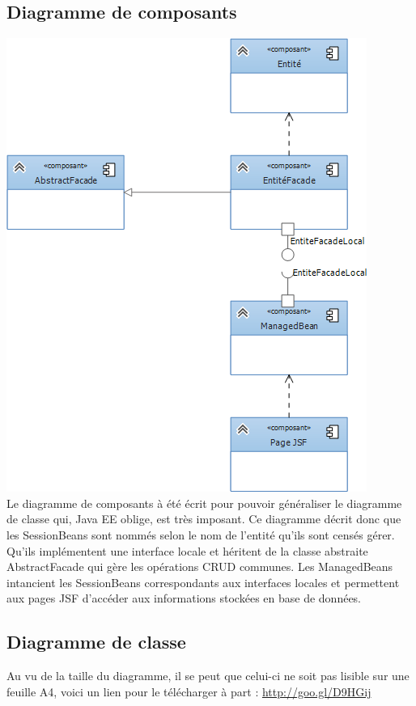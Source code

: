 \subsection{Diagramme de composants}
\includegraphics[scale=0.5]{Res/diagrammeComposants.png}\\
Le diagramme de composants à été écrit pour pouvoir généraliser le diagramme de classe qui, Java EE oblige, est très imposant.
Ce diagramme décrit donc que les SessionBeans sont nommés selon le nom de l'entité qu'ils sont censés gérer. Qu'ils implémentent une interface locale et héritent de la classe abstraite AbstractFacade qui gère les opérations CRUD communes.
Les ManagedBeans intancient les SessionBeans correspondants aux interfaces locales et permettent aux pages JSF d'accéder aux informations stockées en base de données.
\subsection{Diagramme de classe}
\clearpage
\begin{figure}[h!]

\end{figure}
\clearpage
Au vu de la taille du diagramme, il se peut que celui-ci ne soit pas lisible sur une feuille A4, voici un lien pour le télécharger à part : \href{http://goo.gl/D9HGij}{http://goo.gl/D9HGij}
